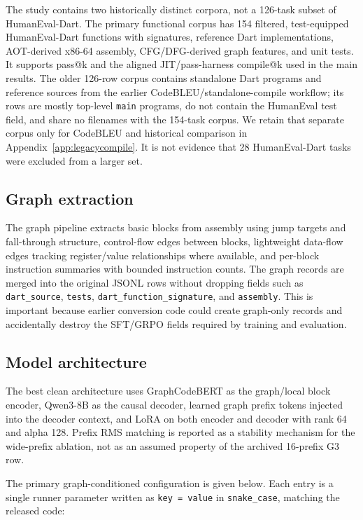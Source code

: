 \documentclass[11pt]{article}
\begin{document}
The study contains two historically distinct corpora, not a 126-task subset of HumanEval-Dart. The primary functional corpus has 154 filtered, test-equipped HumanEval-Dart functions with signatures, reference Dart implementations, AOT-derived x86-64 assembly, CFG/DFG-derived graph features, and unit tests. It supports pass@k and the aligned JIT/pass-harness compile@k used in the main results. The older 126-row corpus contains standalone Dart programs and reference sources from the earlier CodeBLEU/standalone-compile workflow; its rows are mostly top-level \texttt{main} programs, do not contain the HumanEval test field, and share no filenames with the 154-task corpus. We retain that separate corpus only for CodeBLEU and historical comparison in Appendix~\ref{app:legacycompile}. It is not evidence that 28 HumanEval-Dart tasks were excluded from a larger set.

\subsection{Graph extraction}

The graph pipeline extracts basic blocks from assembly using jump targets and fall-through structure, control-flow edges between blocks, lightweight data-flow edges tracking register/value relationships where available, and per-block instruction summaries with bounded instruction counts. The graph records are merged into the original JSONL rows without dropping fields such as \texttt{dart\_source}, \texttt{tests}, \texttt{dart\_function\_signature}, and \texttt{assembly}. This is important because earlier conversion code could create graph-only records and accidentally destroy the SFT/GRPO fields required by training and evaluation.

\subsection{Model architecture}

The best clean architecture uses GraphCodeBERT as the graph/local block encoder, Qwen3-8B as the causal decoder, learned graph prefix tokens injected into the decoder context, and LoRA on both encoder and decoder with rank 64 and alpha 128. Prefix RMS matching is reported as a stability mechanism for the wide-prefix ablation, not as an assumed property of the archived 16-prefix G3 row.

The primary graph-conditioned configuration is given below. Each entry is a single runner parameter written as \texttt{key = value} in \texttt{snake\_case}, matching the released code:
\end{document}
